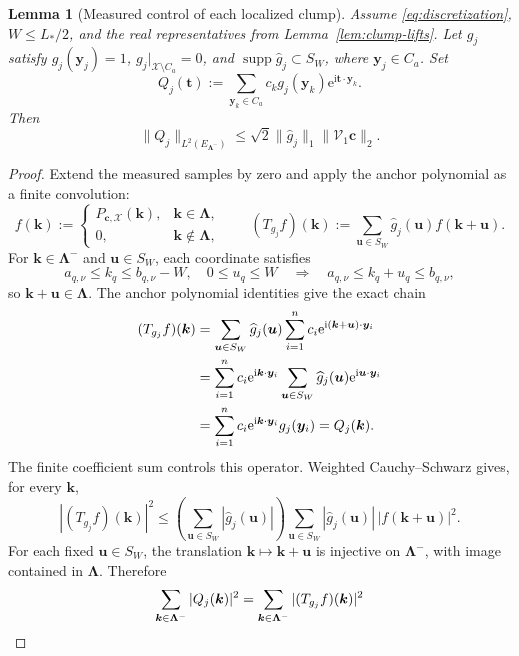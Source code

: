\documentclass[11pt]{article}
\newtheorem{lemma}{Lemma}
\newcommand{\V}{\mathcal V}
\newcommand{\X}{\mathcal X}
\newcommand{\ii}{\mathrm i}
\begin{document}
\begin{lemma}[Measured control of each localized clump]\label{lem:anchor-measurement}
Assume \eqref{eq:discretization}, $W\le L_*/2$, and the real representatives from Lemma~\ref{lem:clump-lifts}. Let $g_j$ satisfy $g_j(\bm y_j)=1$, $g_j|_{\X\setminus C_a}=0$, and $\operatorname{supp}\widehat g_j\subset S_W$, where $\bm y_j\in C_a$. Set
\[
Q_j(\bm t):=\sum_{\bm y_k\in C_a}c_k g_j(\bm y_k)\mathrm e^{\ii\bm t\cdot\bm y_k}.
\]
Then
\begin{equation}\label{eq:anchor-measurement}
\|Q_j\|_{L^2(E_{\bm\Lambda^-})}\le\sqrt2\|\widehat g_j\|_1\|\V_1\bm c\|_2.
\end{equation}
\end{lemma}
\begin{proof}
Extend the measured samples by zero and apply the anchor polynomial as a finite convolution:
\[
f(\bm k):=\begin{cases}P_{\bm c,\X}(\bm k),&\bm k\in\bm\Lambda,\\0,&\bm k\notin\bm\Lambda,\end{cases}\qquad (T_{g_j}f)(\bm k):=\sum_{\bm u\in S_W}\widehat g_j(\bm u)f(\bm k+\bm u).
\]
For $\bm k\in\bm\Lambda^-$ and $\bm u\in S_W$, each coordinate satisfies
\[
a_{q,\nu}\le k_q\le b_{q,\nu}-W,\quad 0\le u_q\le W\quad\Longrightarrow\quad a_{q,\nu}\le k_q+u_q\le b_{q,\nu},
\]
so $\bm k+\bm u\in\bm\Lambda$. The anchor polynomial identities give the exact chain
\begin{align}
(T_{g_j}f)(\bm k)&=\sum_{\bm u\in S_W}\widehat g_j(\bm u)\sum_{i=1}^n c_i\mathrm e^{\ii(\bm k+\bm u)\cdot\bm y_i}\notag\\
&=\sum_{i=1}^n c_i\mathrm e^{\ii\bm k\cdot\bm y_i}\sum_{\bm u\in S_W}\widehat g_j(\bm u)\mathrm e^{\ii\bm u\cdot\bm y_i}\notag\\
&=\sum_{i=1}^n c_i\mathrm e^{\ii\bm k\cdot\bm y_i}g_j(\bm y_i)=Q_j(\bm k).\label{eq:anchor-convolution}
\end{align}
The finite coefficient sum controls this operator. Weighted Cauchy--Schwarz gives, for every $\bm k$,
\[
|(T_{g_j}f)(\bm k)|^2\le\left(\sum_{\bm u\in S_W}|\widehat g_j(\bm u)|\right)\sum_{\bm u\in S_W}|\widehat g_j(\bm u)|\,|f(\bm k+\bm u)|^2.
\]
For each fixed $\bm u\in S_W$, the translation $\bm k\mapsto\bm k+\bm u$ is injective on $\bm\Lambda^-$, with image contained in $\bm\Lambda$. Therefore
\begin{align}
\sum_{\bm k\in\bm\Lambda^-}|Q_j(\bm k)|^2&=\sum_{\bm k\in\bm\Lambda^-}|(T_{g_j}f)(\bm k)|^2\notag\\

\end{align}
\end{proof}
\end{document}
